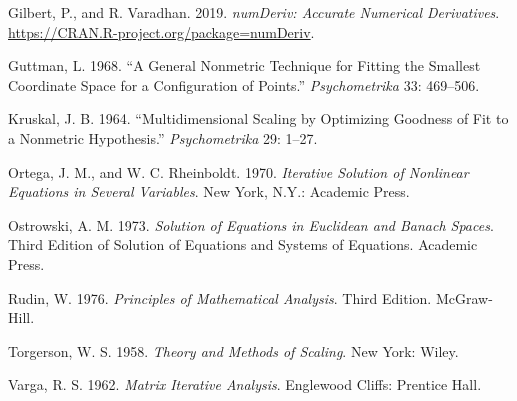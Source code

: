 \documentclass[
  12pt,
]{article}
\newlength{\cslhangindent}
\newenvironment{CSLReferences}[2] %
 {\begin{list}{}{%
  \setlength{\itemindent}{0pt}
  \setlength{\leftmargin}{0pt}
  \setlength{\parsep}{0pt}
  \ifodd #1
   \setlength{\leftmargin}{\cslhangindent}
   \setlength{\itemindent}{-1\cslhangindent}
  \fi
  \setlength{\itemsep}{#2\baselineskip}}}
 {\end{list}}
\begin{document}
\begin{CSLReferences}{1}{0}
Gilbert, P., and R. Varadhan. 2019. \emph{{numDeriv: Accurate Numerical Derivatives}}. \url{https://CRAN.R-project.org/package=numDeriv}.

Guttman, L. 1968. {``{A General Nonmetric Technique for Fitting the Smallest Coordinate Space for a Configuration of Points}.''} \emph{Psychometrika} 33: 469--506.

Kruskal, J. B. 1964. {``{Multidimensional Scaling by Optimizing Goodness of Fit to a Nonmetric Hypothesis}.''} \emph{Psychometrika} 29: 1--27.

Ortega, J. M., and W. C. Rheinboldt. 1970. \emph{{Iterative Solution of Nonlinear Equations in Several Variables}}. New York, N.Y.: Academic Press.

Ostrowski, A. M. 1973. \emph{Solution of Equations in Euclidean and Banach Spaces}. Third Edition of Solution of Equations and Systems of Equations. Academic Press.

Rudin, W. 1976. \emph{Principles of Mathematical Analysis}. Third Edition. McGraw-Hill.

Torgerson, W. S. 1958. \emph{{Theory and Methods of Scaling}}. New York: Wiley.

Varga, R. S. 1962. \emph{{Matrix Iterative Analysis}}. Englewood Cliffs: Prentice Hall.

\end{CSLReferences}
\end{document}
